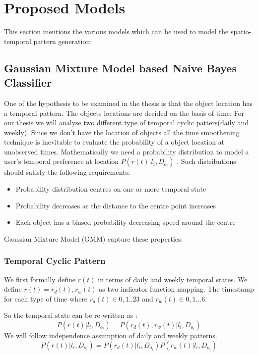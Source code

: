 \newpage
\section{Proposed Models}

This section mentions the various models which can be used to model the spatio-temporal pattern generation:

\subsection{Gaussian Mixture Model based Naive Bayes Classifier}
\label{sub:GMM}
One of the hypothesis to be examined in the thesis is that the object location has a temporal pattern. The objects locations are decided on the basis of time. For our thesis we will analyse two different type of temporal cyclic patters(daily and weekly).
Since we don't have the location of objects all the time smoothening technique is inevitable to evaluate the probability of a object location at unobserved times.
Mathematically we need a probability distribution to model a user's temporal preference at location $P(r(t) | l_i, D_{o_i})$ . Such distributions should satisfy the following requirements:
\begin{itemize}
	\item Probability distribution centres on one or more temporal state
	\item Probability decreases as the distance to the centre point increases
	\item Each object has a biased probability decreasing speed around the centre
\end{itemize}

Gaussian Mixture Model (GMM) capture these properties.

\subsubsection*{Temporal Cyclic Pattern}
\label{ssub:}
We first formally define $r(t)$ in terms of daily and weekly temporal states. We define $r(t) = {r_d(t), r_w(t)} $ as two indicator function mapping. The timestamp for each type of time where $r_d(t) \in {0,1 .. 23}$ and $r_w(t) \in {0,1 ... 6}$.

So the temporal state can be re-written as :
\begin{equation}
	P(r(t) | l_i, D_{o_i}) = P(r_d(t), r_w(t) | l_i, D_{o_i})
\end{equation}
We will follow independence assumption of daily and weekly patterns.
\begin{equation}
	P(r(t) | l_i, D_{o_i}) = P(r_d(t)| l_i, D_{o_i}) P(r_w(t) | l_i, D_{o_i})
\end{equation}

